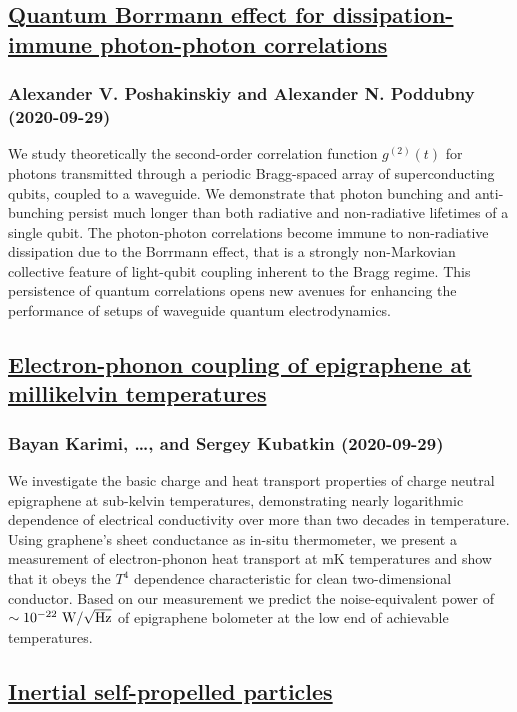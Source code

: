 \subsection*{\href{http://arxiv.org/abs/2009.14049v1}{Quantum Borrmann effect for dissipation-immune photon-photon  correlations}}
\subsubsection*{Alexander V. Poshakinskiy and Alexander N. Poddubny (2020-09-29)}
We study theoretically the second-order correlation function $g^{(2)}(t)$ for
photons transmitted through a periodic Bragg-spaced array of superconducting
qubits, coupled to a waveguide. We demonstrate that photon bunching and
anti-bunching persist much longer than both radiative and non-radiative
lifetimes of a single qubit. The photon-photon correlations become immune to
non-radiative dissipation due to the Borrmann effect, that is a strongly
non-Markovian collective feature of light-qubit coupling inherent to the Bragg
regime. This persistence of quantum correlations opens new avenues for
enhancing the performance of setups of waveguide quantum electrodynamics.

\subsection*{\href{http://arxiv.org/abs/2009.14038v1}{Electron-phonon coupling of epigraphene at millikelvin temperatures}}
\subsubsection*{Bayan Karimi, \dots, and Sergey Kubatkin (2020-09-29)}
We investigate the basic charge and heat transport properties of charge
neutral epigraphene at sub-kelvin temperatures, demonstrating nearly
logarithmic dependence of electrical conductivity over more than two decades in
temperature. Using graphene's sheet conductance as in-situ thermometer, we
present a measurement of electron-phonon heat transport at mK temperatures and
show that it obeys the $T^4$ dependence characteristic for clean
two-dimensional conductor. Based on our measurement we predict the
noise-equivalent power of $\sim 10^{-22}~{\rm W}/\sqrt{{\rm Hz}}$ of
epigraphene bolometer at the low end of achievable temperatures.

\subsection*{\href{http://arxiv.org/abs/2009.14032v1}{Inertial self-propelled particles}}
